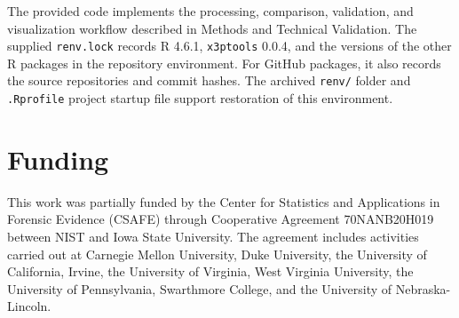\documentclass[11pt,a4paper]{article}
\begin{document}
\begin{table}
{}

\end{table}%

The provided code implements the processing, comparison, validation, and
visualization workflow described in Methods and Technical Validation.
The supplied \texttt{renv.lock} records R 4.6.1, \texttt{x3ptools}
0.0.4, and the versions of the other R packages in the repository
environment. For GitHub packages, it also records the source
repositories and commit hashes. The archived \texttt{renv/} folder and
\texttt{.Rprofile} project startup file support restoration of this
environment.

\renewcommand{\bibsection}{\section*{\refname}\addcontentsline{toc}{section}{\refname}}





\section*{Funding}
This work was partially funded by the Center for Statistics and
Applications in Forensic Evidence (CSAFE) through Cooperative Agreement
70NANB20H019 between NIST and Iowa State University. The agreement
includes activities carried out at Carnegie Mellon University, Duke
University, the University of California, Irvine, the University of
Virginia, West Virginia University, the University of Pennsylvania,
Swarthmore College, and the University of Nebraska-Lincoln.
\end{document}

